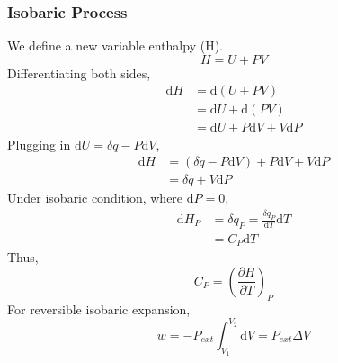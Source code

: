 \documentclass[letterpaper]{article}
\newcommand{\diff}{\mathrm{d}}
\begin{document}
\subsubsection*{Isobaric Process}
We define a new variable enthalpy (H).
\begin{equation*}
    H=U+PV
\end{equation*}
Differentiating both sides,
\begin{equation*}
    \begin{aligned}
        \diff H&=\diff (U+PV)\\
        &=\diff U+\diff (PV)\\
        &=\diff U+P\diff V+V\diff P
    \end{aligned}
\end{equation*}
Plugging in $\diff U=\delta q-P\diff V$,
\begin{equation*}
    \begin{aligned}
        \diff H&=(\delta q-P\diff V)+P\diff V+V\diff P\\
        &=\delta q+V\diff P
    \end{aligned}
\end{equation*}
Under isobaric condition, where $\diff P=0$,
\begin{equation*}
    \begin{aligned}
        \diff H_P&=\delta q_P=\frac{\delta q_P}{\diff T}\diff T\\
        &=C_P\diff T
    \end{aligned}
\end{equation*}
Thus,
\begin{equation*}
    \boxed{C_P=(\frac{\partial H}{\partial T})_P}
\end{equation*}
For reversible isobaric expansion,
\begin{equation*}
    w=-P_{ext}\int_{V_1}^{V_2}\diff V=P_{ext}\Delta V
\end{equation*}
\end{document}
